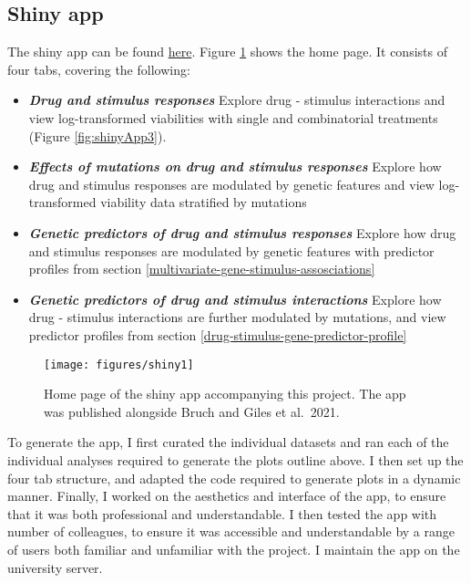 \documentclass[11pt, a4paper, twosided]{book}
\begin{document}
\hypertarget{shiny-app}{%
\subsection{Shiny app}\label{shiny-app}}

The shiny app can be found \href{https://www.imbi.uni-heidelberg.de/dietrichlab/CLL_Microenvironment/}{here}. Figure \ref{fig:shinyApp1} shows the home page. It consists of four tabs, covering the following:
\begin{itemize}
    \item  \textbf{\textit{Drug and stimulus responses}} Explore drug - stimulus interactions and view log-transformed viabilities with single and combinatorial treatments (Figure \ref{fig:shinyApp3}).
    \item \textbf{\textit{Effects of mutations on drug and stimulus responses}} Explore how drug and stimulus responses are modulated by genetic features and view log-transformed viability data stratified by mutations
    \item \textbf{\textit{Genetic predictors of drug and stimulus responses}} Explore how drug and stimulus responses are modulated by genetic features with predictor profiles from section \ref{multivariate-gene-stimulus-assosciations}
    \item \textbf{\textit{Genetic predictors of drug and stimulus interactions}} Explore how drug - stimulus interactions are further modulated by mutations, and view predictor profiles from section \ref{drug-stimulus-gene-predictor-profile}

\end{itemize}

\begin{figure}

{\centering \texttt{[image: figures/shiny1]} 

}

\caption{Home page of the shiny app accompanying this project. The app was published alongside Bruch and Giles et al.~2021.}\label{fig:shinyApp1}
\end{figure}
To generate the app, I first curated the individual datasets and ran each of the individual analyses required to generate the plots outline above. I then set up the four tab structure, and adapted the code required to generate plots in a dynamic manner. Finally, I worked on the aesthetics and interface of the app, to ensure that it was both professional and understandable. I then tested the app with number of colleagues, to ensure it was accessible and understandable by a range of users both familiar and unfamiliar with the project. I maintain the app on the university server.
\end{document}
